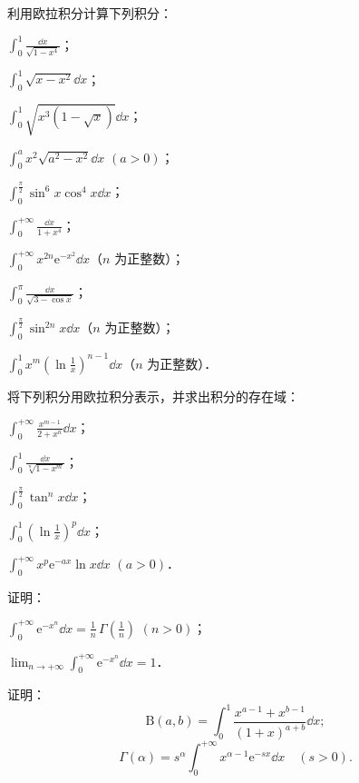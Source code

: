 \begin{xiti}
\item 利用欧拉积分计算下列积分：
\begin{ziti}
\item $\displaystyle\int_{0}^{1}\frac{\dd x}{\sqrt{1-x^{4}}}$；
\item $\displaystyle\int_{0}^{1}\sqrt{x-x^{2}}\dd x$；
\item $\displaystyle\int_{0}^{1}\sqrt{x^{3}(1-\sqrt{x})}\dd x$；
\item $\displaystyle\int_{0}^{a}x^{2}\sqrt{a^{2}-x^{2}}\dd x$ $(a>0)$；
\item $\displaystyle\int_{0}^{\frac{\pi}{2}}\sin^{6}x\cos^{4}x\dd x$；
\item $\displaystyle\int_{0}^{+\infty}\frac{\dd x}{1+x^{4}}$；
\item $\displaystyle\int_{0}^{+\infty}x^{2n}\mathrm{e}^{-x^{2}}\dd x$（$n$ 为正整数）；
\item $\displaystyle\int_{0}^{\pi}\frac{\dd x}{\sqrt{3-\cos x}}$；
\item $\displaystyle\int_{0}^{\frac{\pi}{2}}\sin^{2n}x\dd x$（$n$ 为正整数）；
\item $\displaystyle\int_{0}^{1}x^{m}\left(\ln\frac{1}{x}\right)^{n-1}\dd x$（$n$ 为正整数）．
\end{ziti}
\item 将下列积分用欧拉积分表示，并求出积分的存在域：
\begin{ziti}
\item $\displaystyle\int_{0}^{+\infty}\frac{x^{m-1}}{2+x^{n}}\dd x$；
\item $\displaystyle\int_{0}^{1}\frac{\dd x}{\sqrt[n]{1-x^{m}}}$；
\item $\displaystyle\int_{0}^{\frac{\pi}{2}}\tan^{n}x\dd x$；
\item $\displaystyle\int_{0}^{1}\left(\ln\frac{1}{x}\right)^{p}\dd x$；
\item $\displaystyle\int_{0}^{+\infty}x^{p}\mathrm{e}^{-ax}\ln x\dd x$ $(a>0)$．
\end{ziti}
\item 证明：
\begin{ziti}
\item $\displaystyle\int_{0}^{+\infty}\mathrm{e}^{-x^{n}}\dd x=\frac{1}{n}\,\Gamma\!\left(\frac{1}{n}\right)$ $(n>0)$；
\item $\displaystyle\lim_{n\to+\infty}\int_{0}^{+\infty}\mathrm{e}^{-x^{n}}\dd x=1$．
\end{ziti}
\item 证明：
\[
\mathrm{B}(a,b)=\int_{0}^{1}\frac{x^{a-1}+x^{b-1}}{(1+x)^{a+b}}\dd x;
\]
\[
\Gamma(\alpha)=s^{\alpha}\int_{0}^{+\infty}x^{\alpha-1}\mathrm{e}^{-sx}\dd x\quad(s>0).
\]
\end{xiti}
